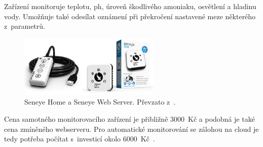             Zařízení monitoruje teplotu, \acs{ph}, úroveň škodlivého amoniaku, osvětlení a hladinu vody. Umožňuje také odesílat oznámení při překročení nastavené meze některého z~parametrů.

            \begin{figure}[h!]
                \centering
                \includegraphics[width=0.6\textwidth]{obrazky/trh/seneye-home.jpg}
                \caption{Seneye Home a Seneye Web Server. Převzato z~\cite{seneye-home}.}
                \label{fig:obrazky-trh-seneye-home-jpg}
            \end{figure}

            Cena samotného monitorovacího zařízení je přibližně \qty{3000}{Kč} a podobná je také cena zmíněného webserveru. Pro automatické monitorování se zálohou na cloud je tedy potřeba počítat s~investicí okolo \qty{6000}{Kč}~\cite{seneye-home}.
            


        
